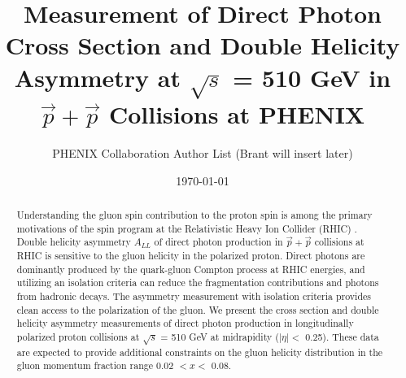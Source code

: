 \documentclass[twocolumn,letterpaper,aps,prl,longbibliography,superscriptaddress,floatfix]{revtex4-2}
\begin{document}


\title{Measurement of Direct Photon Cross Section and Double Helicity Asymmetry at $\sqrt{s}$ = 510 GeV in $\vec{p}+\vec{p}$ Collisions at PHENIX}

\author{PHENIX Collaboration Author List (Brant will insert later)}

\date{\today}

\begin{abstract}
Understanding the gluon spin contribution to the proton spin is among the primary motivations of the spin program at the Relativistic Heavy Ion Collider (RHIC) \cite{aschenauer2015rhic}. Double helicity asymmetry $A_{LL}$ of direct photon production in $\vec{p}+\vec{p}$ collisions at RHIC is sensitive to the gluon helicity in the polarized proton. Direct photons are dominantly produced by the quark-gluon Compton process at RHIC energies, and utilizing an isolation criteria can reduce the fragmentation contributions and photons from hadronic decays. The asymmetry measurement with isolation criteria provides clean access to the polarization of the gluon. We present the cross section and double helicity asymmetry measurements of direct photon production in longitudinally polarized proton collisions at $\sqrt{s}$ = 510 GeV at midrapidity ($|\eta| <$ 0.25). These data are expected to provide additional constraints on the gluon helicity distribution in the gluon momentum fraction range 0.02 $< x <$ 0.08.
\end{abstract}

	
\maketitle

\end{document}
